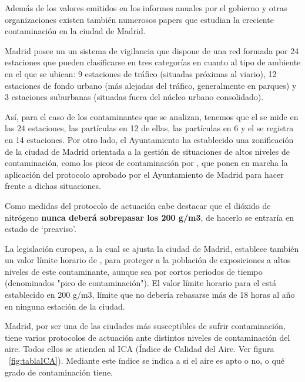 
Además de los valores emitidos en los informes anuales por el gobierno y otras organizaciones existen también numerosos papers \cite{nunez-alonso_statistical_2019} \cite{gomez-losada_data_2019} que estudian la creciente contaminación en la ciudad de Madrid.
 
 Madrid posee un un sistema de vigilancia que dispone de una red formada por 24 estaciones que pueden clasificarse en tres categorías en cuanto al tipo de ambiente en el que se ubican: 9 estaciones de tráfico (situadas próximas al viario), 12 estaciones de fondo urbano (más alejadas del tráfico, generalmente en parques) y 3 estaciones suburbanas (situadas fuera del núcleo urbano consolidado).
 

 Así, para el caso de los contaminantes que se analizan, tenemos que el  se mide en las 24 estaciones, las partículas  en 12 de ellas, las partículas  en 6 y el  se registra en 14 estaciones. Por otro lado, el Ayuntamiento ha establecido una zonificación de la ciudad de Madrid orientada a la gestión de situaciones de altos niveles de contaminación, como los picos de contaminación por , que ponen en marcha la aplicación del protocolo aprobado por el Ayuntamiento de Madrid para hacer frente a dichas situaciones.
 
 Como medidas del protocolo de actuación cabe destacar que el dióxido de nitrógeno  \textbf{nunca deberá sobrepasar los 200 \textmugreek g/m3}, de hacerlo se entraría en estado de ‘preaviso’.
 
 La legislación europea, a la cual se ajusta la ciudad de Madrid, establece también un valor límite horario de , para proteger a la población de exposiciones a altos niveles de este contaminante, aunque sea por cortos periodos de tiempo (denominados "pico de contaminación"). El valor límite horario para el  está establecido en 200 \textmugreek g/m3, límite que no debería rebasarse más de 18 horas al año en ninguna estación de la ciudad.
 
    Madrid, por ser una de las ciudades más susceptibles de sufrir contaminación, tiene varios protocolos de actuación ante distintos niveles de contaminación del aire. Todos ellos se atienden al ICA (Índice de Calidad del Aire. Ver figura ~\ref{fig:tablaICA}). Mediante este índice se indica a si el aire es apto o no, o qué grado de contaminación tiene. 
  
